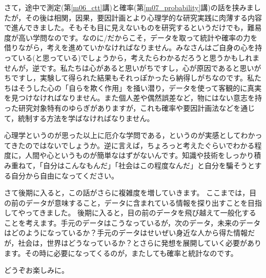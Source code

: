 \documentclass{ltjbook}
\begin{document}
さて，途中で測定(第\ref{m06_ctt}講)と確率(第\ref{m07_probability}講)の話を挟みましたが，その後は相関，因果，要因計画とより心理学的な研究実践に肉薄する内容で進んできました。そもそも目に見えないものを研究するというだけでも，難易度が高い学問なのです。なのに/だからこそ，データを取って統計や確率の力を借りながら，考えを進めていかなければなりません。みなさんはご自身の心を持っている(と思っている)でしょうから，考えたらわかるだろうと思うかもしれませんが，逆です。私たちは心があると思いがちですし，心が原因であると思いがちですし，実験して得られた結果もそれっぽかったら納得しがちなのです。私たちはそうした心の「自らを欺く作用」を掻い潜り，データを使って客観的に真実を見つけなければなりません。また個人差や偶然誤差など，物にはない意志を持った研究対象特有のゆらぎがありますが，これも確率や要因計画法などを通じて，統制する方法を学ばなければなりません。

心理学というのが思った以上に厄介な学問である，というのが実感としてわかってきたのではないでしょうか。逆に言えば，ちょろっと考えたぐらいでわかる程度に，人間や心というものが簡単なはずがないんです。知識や技術をしっかり積み重ねて，「自分はこんなもんだ」「社会はこの程度なんだ」と自分を騙そうとする自分から自由になってください。

さて後期に入ると，この話がさらに複雑度を増していきます。
ここまでは，目の前のデータが意味すること，データに含まれている情報を探り出すことを目指してやってきました。
後期に入ると，目の前のデータを飛び越えて一般化することを考えます。手元のデータはこうなっているが，次のデータ，未来のデータはどのようになっているか？手元のデータはせいぜい身近な人から得た情報だが，社会は，世界はどうなっているか？とさらに発想を展開していく必要があります。その時に必要になってくるのが，またしても確率と統計なのです。

どうぞお楽しみに。
\end{document}
